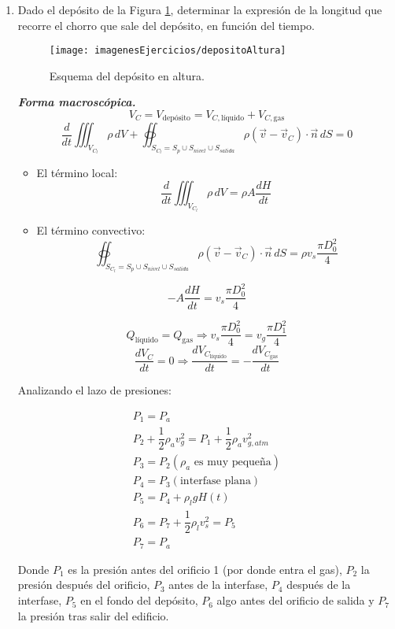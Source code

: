 \begin{enumerate}
\newpage
\item Dado el depósito de la Figura \ref{fig:depositoaltura}, determinar la expresión de la longitud que recorre el chorro que sale del depósito, en función del tiempo.
\begin{figure}[H]
	\centering
	\texttt{[image: imagenesEjercicios/depositoAltura]}
	\caption{Esquema del depósito en altura.}
	\label{fig:depositoaltura}
\end{figure}

\blue
\textit{\textbf{Forma macroscópica.}}
\[V_C = V_{\text{depósito}} = V_{C, \text{líquido}} + V_{C, \text{gas}}\]
\[\dfrac{d}{dt} \iiint_{V_{C_l}} \rho\,dV + \oiint_{S_{C_l} = S_p \cup S_{nivel} \cup S_{salida}} \rho (\vec{v}-\vec{v}_C) \cdot \vec{n}\,dS=0\]

\begin{itemize}
	\item El término local:
	\[\dfrac{d}{dt} \iiint_{V_{C_l}} \rho\,dV = \rho A \dfrac{dH}{dt}\]
	\item El término convectivo:
	\[\oiint_{S_{C_l} = S_p \cup S_{nivel} \cup S_{salida}} \rho (\vec{v}-\vec{v}_C) \cdot \vec{n}\,dS=\rho v_s \dfrac{\pi D_0^2}{4}\]
\end{itemize}

\[-A\dfrac{dH}{dt} = v_s\dfrac{\pi D_0^2}{4}\]

\[Q_{\text{líquido}} = Q_{\text{gas}} \Rightarrow v_s\dfrac{\pi D_0^2}{4} = v_g\dfrac{\pi D_1^2}{4}\]
\[\dfrac{dV_C}{dt} = 0 \Rightarrow \dfrac{dV_{C_{\text{líquido}}}}{dt} = -\dfrac{dV_{C_{\text{gas}}}}{dt}\]

Analizando el lazo de presiones:

\[
	\begin{matrix}
		P_1 = P_a\\
		P_2 + \dfrac{1}{2}\rho_a v_g^2 = P_1 + \dfrac{1}{2}\rho_a v_{g,atm}^2\\
		P_3 = P_2(\rho_a \text{ es muy pequeña})\\
		P_4 = P_3 (\text{interfase plana})\\
		P_5 = P_4 + \rho_l g H(t)\\
		P_6 = 
		P_7 + \dfrac{1}{2} \rho_l v_s^2 = P_5\\
		P_7 = P_a
	\end{matrix}
\]

Donde $P_1$ es la presión antes del orificio 1 (por donde entra el gas), $P_2$ la presión después del orificio, $P_3$ antes de la interfase, $P_4$ después de la interfase, $P_5$ en el fondo del depósito, $P_6$ algo antes del orificio de salida y $P_7$ la presión tras salir del edificio.



\end{enumerate}
